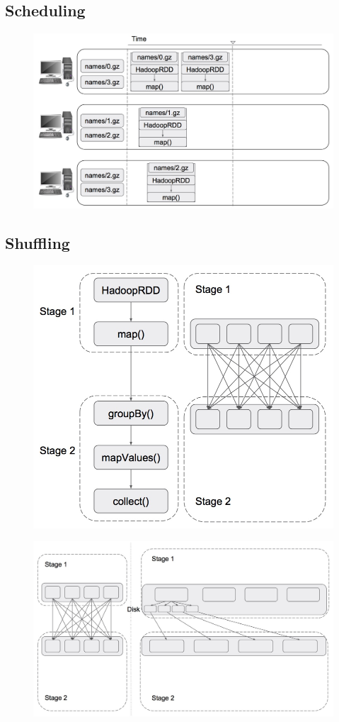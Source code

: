 \subsection{Scheduling}
\begin{frame}
\begin{figure}
\centering
\includegraphics[width=0.9\linewidth]{figures/example2-scheduling.jpg}
\end{figure}
\end{frame}

\subsection{Shuffling}
\begin{frame}
\begin{figure}
\centering
\includegraphics[width=0.6\linewidth]{figures/example2-shuffling.jpg}
\end{figure}
\end{frame}


\begin{frame}
\begin{figure}
\centering
\includegraphics[width=0.9\linewidth]{figures/example2-shuffling-details.jpg}
\end{figure}
\end{frame}